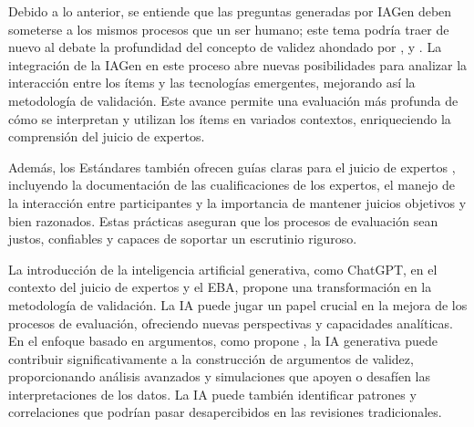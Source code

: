 Debido a lo anterior, se entiende que las preguntas generadas por IAGen
deben someterse a los mismos procesos que un ser humano; este tema
podría traer de nuevo al debate la profundidad del concepto de validez
ahondado por \textcite{Messick1989}, \textcite{Kane2006,Kane2013} y \textcite{Chapelle2021}.
La integración de la IAGen en este proceso abre nuevas posibilidades
para analizar la interacción entre los ítems y las tecnologías
emergentes, mejorando así la metodología de validación. Este avance
permite una evaluación más profunda de cómo se interpretan y utilizan
los ítems en variados contextos, enriqueciendo la comprensión del juicio
de expertos.

Además, los Estándares también ofrecen guías claras para el juicio de
expertos \cite{AERA2014}, incluyendo la documentación de las
cualificaciones de los expertos, el manejo de la interacción entre
participantes y la importancia de mantener juicios objetivos y bien
razonados. Estas prácticas aseguran que los procesos de evaluación sean
justos, confiables y capaces de soportar un escrutinio riguroso.

La introducción de la inteligencia artificial generativa, como ChatGPT,
en el contexto del juicio de expertos y el EBA, propone una
transformación en la metodología de validación. La IA puede jugar un
papel crucial en la mejora de los procesos de evaluación, ofreciendo
nuevas perspectivas y capacidades analíticas. En el enfoque basado en
argumentos, como propone \textcite{Chapelle2021}, la IA generativa puede
contribuir significativamente a la construcción de argumentos de
validez, proporcionando análisis avanzados y simulaciones que apoyen o
desafíen las interpretaciones de los datos. La IA puede también
identificar patrones y correlaciones que podrían pasar desapercibidos en
las revisiones tradicionales.